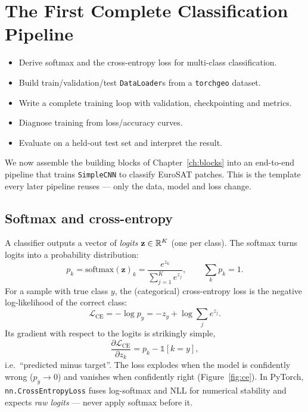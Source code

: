 \chapter{The First Complete Classification Pipeline}
\label{ch:classif}


\begin{objbox}
\begin{itemize}[leftmargin=1.2em,nosep]
  \item Derive softmax and the cross-entropy loss for multi-class classification.
  \item Build train/validation/test \texttt{DataLoader}s from a \texttt{torchgeo} dataset.
  \item Write a complete training loop with validation, checkpointing and metrics.
  \item Diagnose training from loss/accuracy curves.
  \item Evaluate on a held-out test set and interpret the result.
\end{itemize}
\end{objbox}

We now assemble the building blocks of Chapter~\ref{ch:blocks} into an
end-to-end pipeline that trains \texttt{SimpleCNN} to classify EuroSAT patches.
This is the template every later pipeline reuses --- only the data, model and
loss change.

\section{Softmax and cross-entropy}

A classifier outputs a vector of \emph{logits} $\mathbf{z}\in\mathbb{R}^{K}$ (one per
class). The softmax turns logits into a probability distribution:
\begin{equation}
p_k = \mathrm{softmax}(\mathbf{z})_k = \frac{e^{z_k}}{\sum_{j=1}^{K} e^{z_j}},
\qquad \sum_k p_k = 1.
\end{equation}
For a sample with true class $y$, the (categorical) cross-entropy loss is the
negative log-likelihood of the correct class:
\begin{equation}
\mathcal{L}_{\mathrm{CE}} = -\log p_y = -z_y + \log\sum_{j} e^{z_j}.
\label{eq:ce}
\end{equation}
Its gradient with respect to the logits is strikingly simple,
\begin{equation}
\frac{\partial \mathcal{L}_{\mathrm{CE}}}{\partial z_k} = p_k - \mathbb{1}[k=y],
\end{equation}
i.e.\ ``predicted minus target''. The loss explodes when the model is
confidently wrong ($p_y\to 0$) and vanishes when confidently right
(Figure~\ref{fig:ce}). In PyTorch, \texttt{nn.CrossEntropyLoss} fuses
log-softmax and NLL for numerical stability and expects \emph{raw logits} ---
never apply softmax before it.

